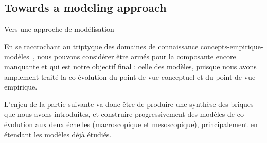 \subsection*{Towards a modeling approach}{Vers une approche de modélisation}


En se raccrochant au triptyque des domaines de connaissance concepts-empirique-modèles~\cite{livet2010}, nous pouvons considérer être armés pour la composante encore manquante et qui est notre objectif final : celle des modèles, puisque nous avons amplement traité la co-évolution du point de vue conceptuel et du point de vue empirique. 


L'enjeu de la partie suivante va donc être de produire une synthèse des briques que nous avons introduites, et construire progressivement des modèles de co-évolution aux deux échelles (macroscopique et mesoscopique), principalement en étendant les modèles déjà étudiés.













